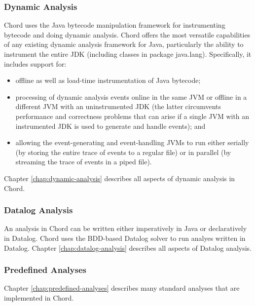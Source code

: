 \subsubsection*{Dynamic Analysis}

Chord uses the  Java bytecode manipulation
framework for instrumenting bytecode and doing dynamic analysis.
Chord offers the most versatile capabilities of any existing dynamic analysis framework
for Java, particularly the ability to instrument the entire JDK (including classes in
package java.lang).
Specifically, it includes support for:
\begin{itemize}
\item
offline as well as load-time instrumentation of Java bytecode;
\item
processing of dynamic analysis events online in the same JVM or offline in a different JVM with an uninstrumented JDK (the latter circumvents performance and correctness problems that can arise if a single JVM with an instrumented JDK is used to generate and handle events); and
\item
allowing the event-generating and event-handling JVMs to run either serially (by storing the entire trace of events to a regular file) or in parallel (by streaming the trace of events in a piped file).
\end{itemize}
Chapter \ref{chap:dynamic-analysis} describes all aspects of dynamic analysis in Chord.

\subsubsection*{Datalog Analysis}

An analysis in Chord can be written either imperatively in Java or declaratively in Datalog.
Chord uses the BDD-based Datalog solver  to
run analyes written in Datalog.
Chapter \ref{chap:datalog-analysis} describes all aspects of Datalog analysis.


\subsubsection*{Predefined Analyses}

Chapter \ref{chap:predefined-analyses} describes many standard analyses that are implemented in Chord.

